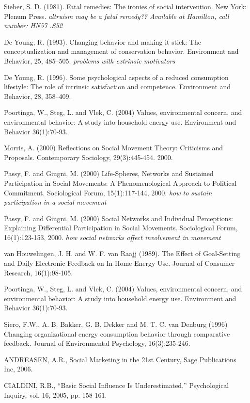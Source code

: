 Sieber, S. D. (1981). Fatal remedies: The ironies of social intervention. New York: Plenum Press. \emph{altruism may be a fatal remedy?? Available at Hamilton, call number: HN57 .S52}

De Young, R. (1993). Changing behavior and making it stick: The conceptualization and management of conservation behavior. Environment and Behavior, 25, 485–505. \emph{problems with extrinsic motivators}

De Young, R. (1996). Some psychological aspects of a reduced consumption lifestyle: The role of intrinsic satisfaction and competence. Environment and Behavior, 28, 358–409.

Poortinga, W., Steg, L. and Vlek, C. (2004) Values, environmental concern, and environmental behavior: A study into household energy use. Environment and Behavior 36(1):70-93.  

Morris, A. (2000) Reflections on Social Movement Theory: Criticisms and Proposals. Contemporary Sociology, 29(3):445-454. 2000.

Passy, F. and Giugni, M. (2000) Life-Spheres, Networks and Sustained Participation in Social Movements: A Phenomenological Approach to Political Commitment. Sociological Forum, 15(1):117-144, 2000. \emph{how to sustain participation in a social movement}

Passy, F. and Giugni, M. (2000) Social Networks and Individual Perceptions: Explaining Differential Participation in Social Movements. Sociological Forum, 16(1):123-153, 2000. \emph{how social networks affect involvement in movement}

van Houwelingen, J. H. and W. F. van Raajj (1989). The Effect of Goal-Setting and Daily Electronic Feedback on In-Home Energy Use. Journal of Consumer Research, 16(1):98-105.

Poortinga, W., Steg, L. and Vlek, C. (2004) Values, environmental concern, and environmental behavior: A study into household energy use. Environment and Behavior 36(1):70-93.

Siero, F.W., A. B. Bakker, G. B. Dekker and M. T. C. van Denburg (1996) Changing organizational energy consumption behavior through comparative feedback. Journal of Environmental Psychology, 16(3):235-246.

ANDREASEN, A.R., Social Marketing in the 21st Century, Sage Publications Inc, 2006.

CIALDINI, R.B., “Basic Social Influence Is Underestimated,” Psychological Inquiry,  vol. 16, 2005, pp. 158-161.

